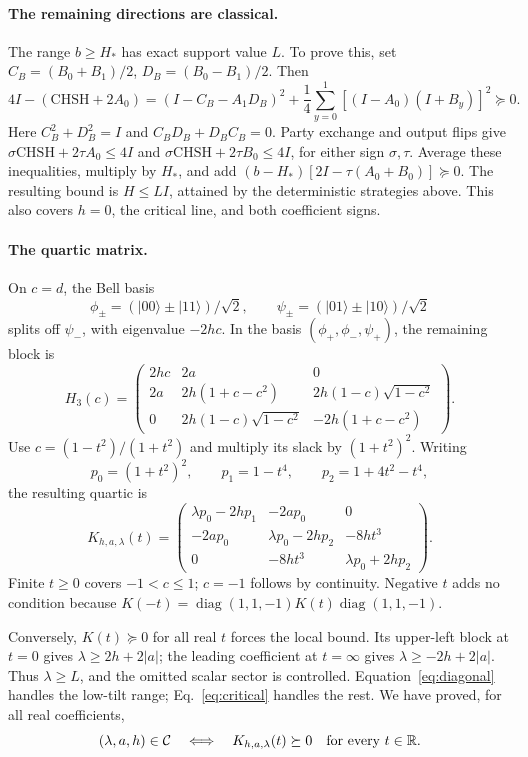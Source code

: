 \documentclass[11pt]{article}
\begin{document}
\paragraph{The remaining directions are classical.}
The range \(b\ge H_*\) has exact support value \(L\).
To prove this, set \(C_B=(B_0+B_1)/2\), \(D_B=(B_0-B_1)/2\). Then
\begin{equation}
 4I-(\mathrm{CHSH}+2A_0)
 =(I-C_B-A_1D_B)^2+
 \frac14\sum_{y=0}^1[(I-A_0)(I+B_y)]^2\succeq0 .
 \label{eq:critical}
\end{equation}
Here \(C_B^2+D_B^2=I\) and \(C_BD_B+D_BC_B=0\).
Party exchange and output flips give
\(\sigma\mathrm{CHSH}+2\tau A_0\le4I\) and
\(\sigma\mathrm{CHSH}+2\tau B_0\le4I\), for either sign \(\sigma,\tau\).
Average these inequalities, multiply by \(H_*\), and add
\((b-H_*)[2I-\tau(A_0+B_0)]\succeq0\).
The resulting bound is \(H\le LI\), attained by the deterministic strategies above.
This also covers \(h=0\), the critical line, and both coefficient signs.

\paragraph{The quartic matrix.}
On \(c=d\), the Bell basis
\[
 \phi_\pm=(|00\rangle\pm|11\rangle)/\sqrt2,\qquad
 \psi_\pm=(|01\rangle\pm|10\rangle)/\sqrt2
\]
splits off \(\psi_-\), with eigenvalue \(-2hc\).
In the basis \((\phi_+,\phi_-,\psi_+)\), the remaining block is
\[
 H_3(c)=
 \begin{pmatrix}
 2hc&2a&0\\
 2a&2h(1+c-c^2)&2h(1-c)\sqrt{1-c^2}\\
 0&2h(1-c)\sqrt{1-c^2}&-2h(1+c-c^2)
 \end{pmatrix}.
\]
Use \(c=(1-t^2)/(1+t^2)\) and multiply its slack by \((1+t^2)^2\).
Writing
\[
 p_0=(1+t^2)^2,\qquad p_1=1-t^4,\qquad p_2=1+4t^2-t^4,
\]
the resulting quartic is
\begin{equation}
 K_{h,a,\lambda}(t)=
 \begin{pmatrix}
 \lambda p_0-2hp_1&-2ap_0&0\\
 -2ap_0&\lambda p_0-2hp_2&-8ht^3\\
 0&-8ht^3&\lambda p_0+2hp_2
 \end{pmatrix}.
 \label{eq:K}
\end{equation}
Finite \(t\ge0\) covers \(-1<c\le1\); \(c=-1\) follows by continuity.
Negative \(t\) adds no condition because
\(K(-t)=\operatorname{diag}(1,1,-1)K(t)\operatorname{diag}(1,1,-1)\).

Conversely, \(K(t)\succeq0\) for all real \(t\) forces the local bound.
Its upper-left block at \(t=0\) gives \(\lambda\ge2h+2|a|\);
the leading coefficient at \(t=\infty\) gives \(\lambda\ge-2h+2|a|\).
Thus \(\lambda\ge L\), and the omitted scalar sector is controlled.
Equation~\eqref{eq:diagonal} handles the low-tilt range; Eq.~\eqref{eq:critical}
handles the rest. We have proved, for all real coefficients,
\begin{equation}
 (\lambda,a,h)\in{\cal C}
 \quad\Longleftrightarrow\quad
 K_{h,a,\lambda}(t)\succeq0\quad\text{for every }t\in\mathbb R .
 \label{eq:cone}
\end{equation}
\end{document}
